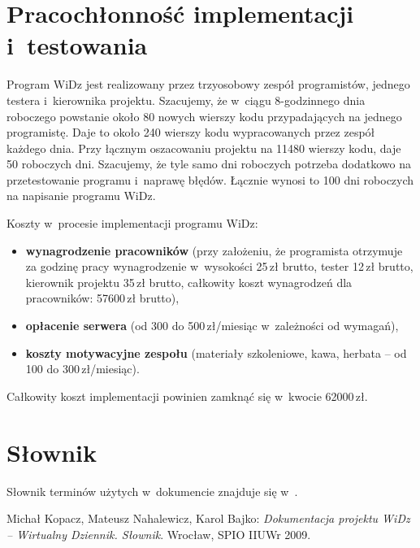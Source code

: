 \documentclass[12pt,leqno,twoside]{mwart}
\begin{document}
\section{Pracochłonność implementacji i~testowania}
\noindent Program WiDz jest realizowany przez trzyosobowy zespół programistów, jednego testera i~kierownika projektu. Szacujemy, że w~ciągu 8-godzinnego dnia roboczego powstanie około 80 nowych wierszy kodu przypadających na jednego programistę. Daje to około 240 wierszy kodu wypracowanych przez zespół każdego dnia. Przy łącznym oszacowaniu projektu na 11480 wierszy kodu, daje 50 roboczych dni. Szacujemy, że tyle samo dni roboczych potrzeba dodatkowo na przetestowanie programu i~naprawę błędów. Łącznie wynosi to 100 dni roboczych na napisanie programu WiDz.

Koszty w~procesie implementacji programu WiDz:
\begin{itemize}
\item \textbf{wynagrodzenie pracowników} (przy założeniu, że programista otrzymuje za godzinę pracy wynagrodzenie w~wysokości 25\,zł brutto, tester 12\,zł brutto, kierownik projektu 35\,zł brutto, całkowity koszt wynagrodzeń dla pracowników: 57600\,zł brutto),
\item \textbf{opłacenie serwera} (od 300 do 500\,zł/miesiąc w~zależności od wymagań),
\item \textbf{koszty motywacyjne zespołu} (materiały szkoleniowe, kawa, herbata -- od 100 do 300\,zł/miesiąc).
\end{itemize}
Całkowity koszt implementacji powinien zamknąć się w~kwocie 62000\,zł.

\section{Słownik}
\noindent Słownik terminów użytych w~dokumencie znajduje się w~\cite{SLO}.

\begin{thebibliography}{99}
 Michał Kopacz, Mateusz Nahalewicz, Karol Bajko: {\it Dokumentacja projektu WiDz -- Wirtualny Dziennik. Słownik}. Wrocław, SPIO IIUWr 2009.
\end{thebibliography}
\end{document}
